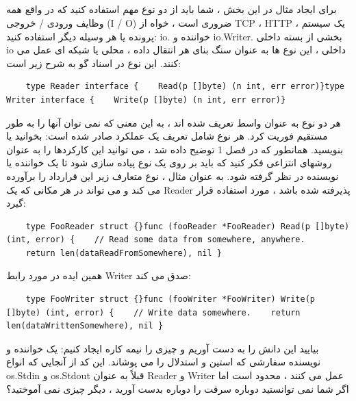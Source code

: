 \documentclass[12pt]{book}
\begin{document}
\subsection{}
برای ایجاد مثال در این بخش ، شما باید از دو نوع مهم استفاده کنید که در واقع همه وظایف ورودی / خروجی (I / O) ضروری است ، خواه از TCP ، HTTP ، یک سیستم پرونده یا هر وسیله دیگر استفاده کنید: io. خواننده و io.Writer. بخشی از بسته داخلی io داخلی ، این نوع ها به عنوان سنگ بنای هر انتقال داده ، محلی یا شبکه ای عمل می کنند. این نوع در اسناد گو به شرح زیر است:
\begin{latin}
	\begin{lstlisting}
	type Reader interface {    Read(p []byte) (n int, err error)}type Writer interface {    Write(p []byte) (n int, err error)}
	\end{lstlisting}
\end{latin}

هر دو نوع به عنوان واسط تعریف شده اند ، به این معنی که نمی توان آنها را به طور مستقیم فوریت کرد. هر نوع شامل تعریف یک عملکرد صادر شده است: بخوانید یا بنویسید. همانطور که در فصل 1 توضیح داده شد ، می توانید این کارکردها را به عنوان روشهای انتزاعی فکر کنید که باید بر روی یک نوع پیاده سازی شود تا یک خواننده یا نویسنده در نظر گرفته شود. به عنوان مثال ، نوع متعارف زیر این قرارداد را برآورده می کند و می تواند در هر مکانی که یک Reader پذیرفته شده باشد ، مورد استفاده قرار گیرد:
\begin{latin}
	\begin{lstlisting}
	type FooReader struct {}func (fooReader *FooReader) Read(p []byte) (int, error) {    // Read some data from somewhere, anywhere.
	return len(dataReadFromSomewhere), nil }
	\end{lstlisting}
\end{latin}

همین ایده در مورد رابط Writer صدق می کند:
\begin{latin}
	\begin{lstlisting}
	type FooWriter struct {}func (fooWriter *FooWriter) Write(p []byte) (int, error) {    // Write data somewhere.    return len(dataWrittenSomewhere), nil }
	\end{lstlisting}
\end{latin}

بیایید این دانش را به دست آوریم و چیزی را نیمه کاره ایجاد کنیم: یک خواننده و نویسنده سفارشی که استین و استدلال را می پوشاند. این کد از آنجایی که انواع os.Stdin و os.Stdout قبلاً به عنوان Reader و Writer عمل می کنند ، محدود است اما اگر شما نمی توانستید دوباره سرقت را دوباره بدست آورید ، دیگر چیزی نمی آموختید؟
\end{document}
